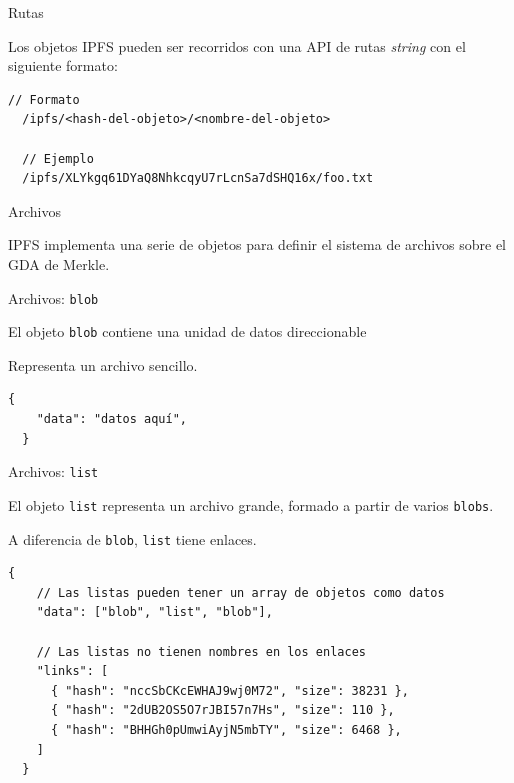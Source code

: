\documentclass[spanish]{beamer}
\begin{document}
\begin{frame}[fragile]{Rutas}

  Los objetos IPFS pueden ser recorridos con una API de rutas \textit{string} con el siguiente formato:

  \begin{lstlisting}[caption={Rutas en IPFS.}]
  // Formato
  /ipfs/<hash-del-objeto>/<nombre-del-objeto>

  // Ejemplo
  /ipfs/XLYkgq61DYaQ8NhkcqyU7rLcnSa7dSHQ16x/foo.txt
\end{lstlisting}

\end{frame}

\begin{frame}{Archivos}

  IPFS implementa una serie de objetos para definir el sistema de archivos sobre el GDA de Merkle.

\end{frame}


\begin{frame}[fragile]{Archivos: \texttt{blob}}

  El objeto \texttt{blob} contiene una unidad de datos direccionable

  Representa un archivo sencillo.

  \begin{lstlisting}[caption={Estructura JSON de un \texttt{blob}.}]
  {
    "data": "datos aquí",
  }
\end{lstlisting}

\end{frame}

\begin{frame}[fragile]{Archivos: \texttt{list}}

  El objeto \texttt{list} representa un archivo grande, formado a partir de varios \texttt{blobs}.

  A diferencia de \texttt{blob}, \texttt{list} tiene enlaces.

  
\begin{lstlisting}[caption={Estructura JSON de un \texttt{list}.}]
  {
    // Las listas pueden tener un array de objetos como datos
    "data": ["blob", "list", "blob"],

    // Las listas no tienen nombres en los enlaces
    "links": [
      { "hash": "nccSbCKcEWHAJ9wj0M72", "size": 38231 },
      { "hash": "2dUB2OS5O7rJBI57n7Hs", "size": 110 },
      { "hash": "BHHGh0pUmwiAyjN5mbTY", "size": 6468 },
    ]
  }
\end{lstlisting}

\end{frame}
\end{document}
